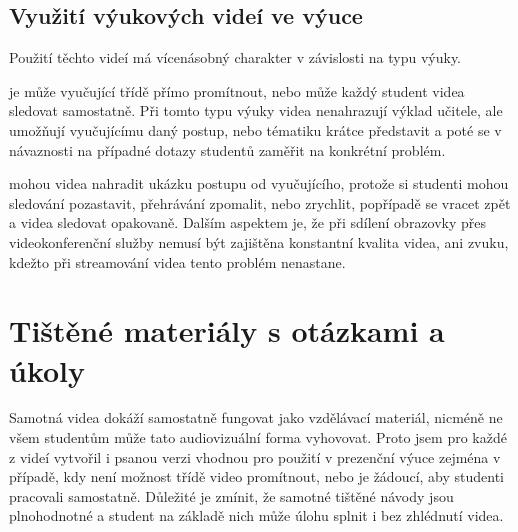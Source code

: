 \subsection{Využití výukových videí ve výuce}
Použití těchto videí má vícenásobný charakter v závislosti na typu výuky.

\noindent{} je může vyučující třídě přímo promítnout, nebo může každý student videa sledovat samostatně. Při tomto typu výuky videa nenahrazují výklad učitele, ale umožňují vyučujícímu daný postup, nebo tématiku krátce představit a poté se v návaznosti na případné dotazy studentů zaměřit na konkrétní problém.

\noindent{} mohou videa nahradit ukázku postupu od vyučujícího, protože si studenti mohou sledování pozastavit, přehrávání zpomalit, nebo zrychlit, popřípadě se vracet zpět a videa sledovat opakovaně. Dalším aspektem je, že při sdílení obrazovky přes videokonferenční služby nemusí být zajištěna konstantní kvalita videa, ani zvuku, kdežto při streamování videa tento problém nenastane. 

\noindent{}

\section{Tištěné materiály s otázkami a úkoly}
Samotná videa dokáží samostatně fungovat jako vzdělávací materiál, nicméně ne všem studentům může tato audiovizuální forma vyhovovat.
Proto jsem pro každé z videí vytvořil i psanou verzi vhodnou pro použití v prezenční výuce zejména v případě, kdy není možnost třídě video promítnout, nebo je žádoucí, aby studenti pracovali samostatně. 
Důležité je zmínit, že samotné tištěné návody jsou plnohodnotné a student na základě nich může úlohu splnit i bez zhlédnutí videa. 

